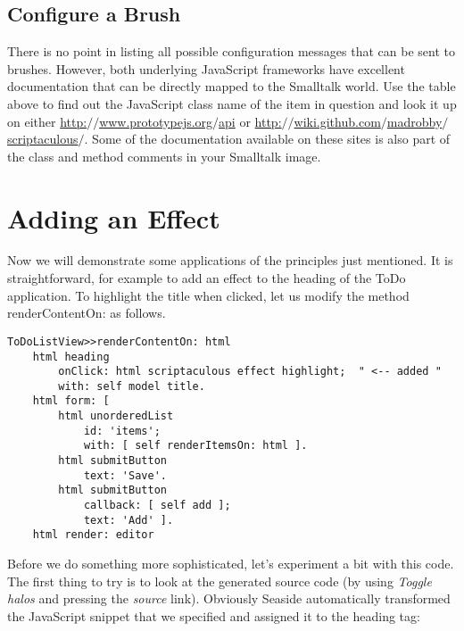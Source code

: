 \documentclass[a4paper,10pt,twoside]{book}
\newcommand{\ct}[1]{{\small\ttfamily\textup{#1}}}
\begin{document}
\subsection{Configure a Brush}
\label{book:web20:scriptaculous:snippetsandbrushes:configurebrush}

There is no point in listing all possible configuration messages that can be sent to brushes. However, both underlying JavaScript frameworks have excellent documentation that can be directly mapped to the Smalltalk world. Use the table above to find out the JavaScript class name of the item in question and look it up on either \href{http://www.prototypejs.org/api}{http:$/$$/$www.prototypejs.org$/$api} or \href{http://wiki.github.com/madrobby/scriptaculous/}{http:$/$$/$wiki.github.com$/$madrobby$/$scriptaculous$/$}. Some of the documentation available on these sites is also part of the class and method comments in your Smalltalk image.

\section{Adding an Effect}
\label{book:web20:scriptaculous:addeffect}

Now we will demonstrate some applications of the principles just mentioned. It is straightforward, for example to add an effect to the heading of the ToDo application. To highlight the title when clicked, let us modify the method \ct{renderContentOn:} as follows.

\begin{lstlisting}
ToDoListView>>renderContentOn: html
    html heading
        onClick: html scriptaculous effect highlight;  " <-- added "
        with: self model title.
    html form: [
        html unorderedList
            id: 'items';
            with: [ self renderItemsOn: html ].
        html submitButton
            text: 'Save'.
        html submitButton
            callback: [ self add ];
            text: 'Add' ].
    html render: editor
\end{lstlisting}

Before we do something more sophisticated, let's experiment a bit with this code. The first thing to try is to look at the generated source code (by using \textit{Toggle halos} and pressing the \textit{source} link). Obviously Seaside automatically transformed the JavaScript snippet that we specified and assigned it to the heading tag:
\end{document}
